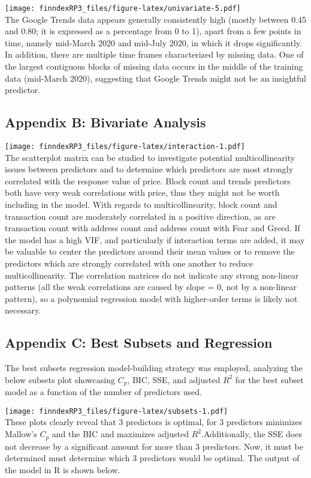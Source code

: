 \documentclass{article}
\begin{document}
\texttt{[image: finndexRP3\_files/figure-latex/univariate-5.pdf]} \\
The Google Trends data appears generally consistently high (mostly between 0.45 and 0.80; it is expressed as a percentage from 0 to 1), apart from a few points in time, namely mid-March 2020 and mid-July 2020, in which it drops significantly. In addition, there are multiple time frames characterized by missing data. One of the largest contiguous blocks of missing data occurs in the middle of the training data (mid-March 2020), suggesting that Google Trends might not be an insightful predictor.
\subsection{Appendix B: Bivariate Analysis}
\texttt{[image: finndexRP3\_files/figure-latex/interaction-1.pdf]} \\
The scatterplot matrix can be studied to investigate potential
multicollinearity issues between predictors and to determine which
predictors are most strongly correlated with the response value of
price. Block count and trends predictors both have
very weak correlations with price, thus they might not be worth including in the model. With regards to multicollinearity, block count and transaction count are moderately correlated in a positive direction, as are transaction count with address count and address count with Fear and Greed. If the model has a high VIF, and particularly if interaction terms are added, it may be valuable to center the predictors around their mean values or to remove the predictors which are strongly correlated with one another to reduce multicollinearity. The correlation matrices do not indicate any strong non-linear patterns (all the weak correlations are caused by slope = 0, not by a non-linear pattern), so a polynomial regression model with higher-order terms is likely not necessary.
\subsection{Appendix C: Best Subsets and Regression}
The best subsets regression model-building strategy was employed, analyzing the below subsets plot showcasing $C_p$, BIC, SSE, and adjusted $R^2$ for the best subset model as a function of the number of predictors used.

\texttt{[image: finndexRP3\_files/figure-latex/subsets-1.pdf]} \mbox{} \\
These plots clearly reveal that 3 predictors is optimal, for 3 predictors minimizes Mallow's $C_p$ and the BIC and maximizes adjusted $R^2$.Additionally, the SSE does not
decrease by a significant amount for more than 3 predictors. Now, it must be determined must determine which 3 predictors would be optimal. The output of the model in R is shown below. \\
\end{document}

